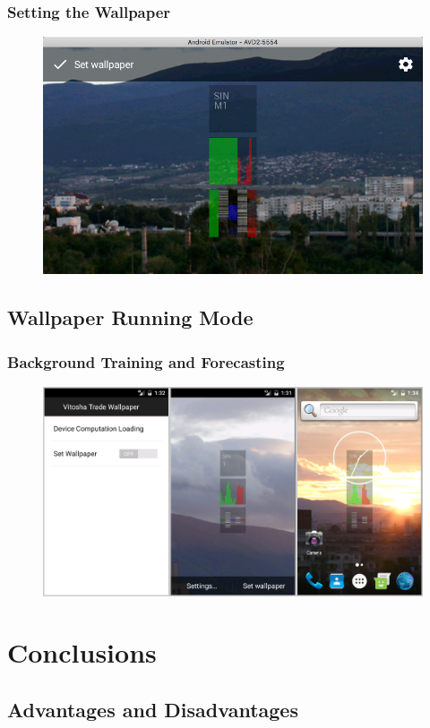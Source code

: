 \documentclass{beamer}
\begin{document}
\begin{frame}
\frametitle{Setting the Wallpaper}
\begin{figure}[h]
  \centering
  \includegraphics[width=0.75\linewidth]{fig04}
\label{fig:04}
\end{figure}
\end{frame}

\subsection{Wallpaper Running Mode}

\begin{frame}
\frametitle{Background Training and Forecasting}
\begin{figure}[h]
  \centering
  \includegraphics[width=0.75\linewidth]{fig02}
\label{fig:02}
\end{figure}
\end{frame}

\section{Conclusions}

\subsection{Advantages and Disadvantages}
\end{document}
